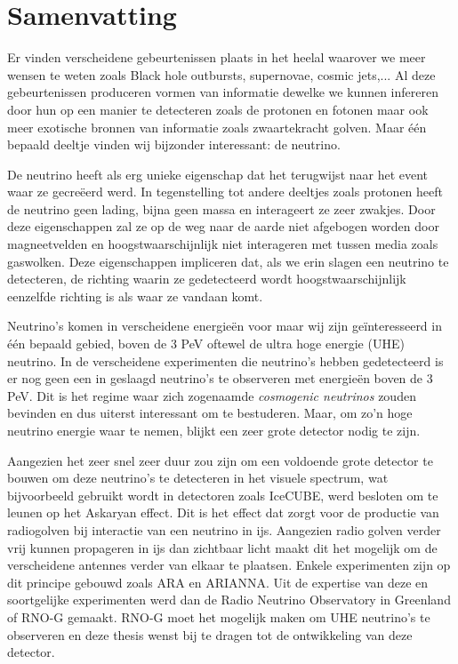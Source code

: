 \chapter*{Samenvatting}
Er vinden verscheidene gebeurtenissen plaats in het heelal waarover we
meer wensen te weten zoals Black hole outbursts, supernovae, cosmic jets,...
Al deze gebeurtenissen produceren vormen van informatie dewelke we kunnen
infereren door hun op een manier te detecteren zoals de protonen en fotonen
maar ook meer exotische bronnen van informatie zoals zwaartekracht golven.
Maar één bepaald deeltje vinden wij bijzonder interessant: de neutrino.

De neutrino heeft als erg unieke eigenschap dat het terugwijst naar het event
waar ze gecreëerd werd. In tegenstelling tot andere deeltjes zoals protonen
heeft de neutrino geen lading, bijna geen massa en interageert ze zeer zwakjes.
Door deze eigenschappen zal ze op de weg naar de aarde niet afgebogen worden 
door magneetvelden en hoogstwaarschijnlijk niet interageren met tussen media zoals
gaswolken. Deze eigenschappen impliceren dat, als we erin slagen een neutrino te detecteren, de 
richting waarin ze gedetecteerd wordt hoogstwaarschijnlijk eenzelfde richting is als
waar ze vandaan komt.

Neutrino's komen in verscheidene energieën voor maar wij zijn geïnteresseerd in één bepaald gebied,
boven de 3 PeV oftewel de ultra hoge energie (UHE) neutrino. In de verscheidene experimenten die 
neutrino's hebben gedetecteerd is er nog geen een in geslaagd neutrino's te observeren met 
energieën boven de 3 PeV. Dit is het regime waar zich zogenaamde \textit{cosmogenic neutrinos} zouden
bevinden en dus uiterst interessant om te bestuderen. Maar, om zo'n hoge neutrino energie waar te nemen,
blijkt een zeer grote detector nodig te zijn.

Aangezien het zeer snel zeer duur zou zijn om een voldoende grote detector te bouwen om deze neutrino's 
te detecteren in het visuele spectrum, wat bijvoorbeeld gebruikt wordt in detectoren zoals IceCUBE,
werd besloten om te leunen op het Askaryan effect. Dit is het effect dat zorgt voor de productie
van radiogolven bij interactie van een neutrino in ijs. Aangezien radio golven verder vrij kunnen
propageren in ijs dan zichtbaar licht maakt dit het mogelijk om de verscheidene antennes verder
van elkaar te plaatsen. Enkele experimenten zijn op dit principe gebouwd zoals ARA en ARIANNA.
Uit de expertise van deze en soortgelijke experimenten werd dan de Radio Neutrino Observatory in Greenland of RNO-G gemaakt.
RNO-G moet het mogelijk maken om UHE neutrino's te observeren en deze thesis wenst bij te dragen tot de ontwikkeling
van deze detector.

